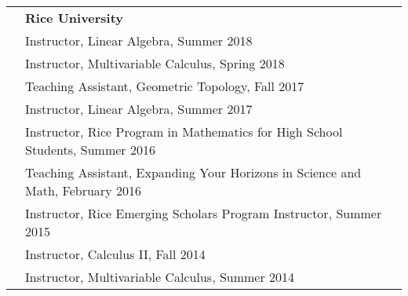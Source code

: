 \documentclass[letterpaper,11pt,oneside]{article}
\begin{document}
\begin{tabular}{@{} l l l}
    \\
    & \textbf{Rice University} \\
    & Instructor, Linear Algebra, Summer 2018 \\
     & Instructor, Multivariable Calculus, Spring 2018 \\   
     & Teaching Assistant, Geometric Topology, Fall 2017 \\
     & Instructor, Linear Algebra, Summer 2017 \\
     & Instructor, Rice Program in Mathematics
for High School Students, Summer 2016 \\
  & Teaching Assistant,  Expanding Your Horizons in Science and Math, February 2016 \\
    & Instructor,  Rice Emerging Scholars Program Instructor, Summer 2015 \\
     & Instructor, Calculus II, Fall 2014 \\
     & Instructor, Multivariable Calculus, Summer 2014 \\   
          \end{tabular}
\end{document}
